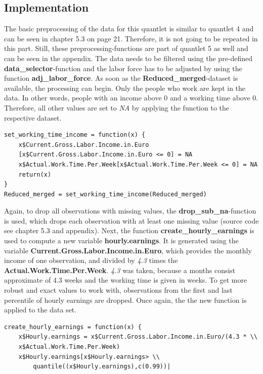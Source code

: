 \documentclass[a4paper]{article}
\begin{document}
{\subsection{Implementation}
The basic preprocessing of the data for this quantlet is similar to quantlet 4 and can be seen in chapter 5.3 on page 21. Therefore, it is not going to be repeated in this part. Still, these preprocessing-functions are part of quantlet 5 as well and can be seen in the appendix. \linebreak\linebreak
The data needs to be filtered using the pre-defined \textbf{data\_selector}-function and the labor force has to be adjusted by using the function \textbf{adj\_labor\_force}.
%
As soon as the \textbf{Reduced\_merged}-dataset is available, the processing can begin. Only the people who work are kept in the data. In other words, people with an income above 0 and a working time above 0. Therefore, all other values are set to \textit{NA} by applying the function to the respective dataset.
\begin{lstlisting}
set_working_time_income = function(x) {
	x$Current.Gross.Labor.Income.in.Euro
	[x$Current.Gross.Labor.Income.in.Euro <= 0] = NA
    x$Actual.Work.Time.Per.Week[x$Actual.Work.Time.Per.Week <= 0] = NA
    return(x)
}
Reduced_merged = set_working_time_income(Reduced_merged)
\end{lstlisting}
Again, to drop all observations with missing values, the \textbf{drop\_sub\_na}-function is used, which drops each observation with at least one missing value (source code see chapter 5.3 and appendix). 
%
Next, the function \textbf{create\_hourly\_earnings} is used to compute a new variable \textbf{hourly.earnings}. It is generated using the variable \textbf{Current.Gross.Labor.Income.in.Euro}, which provides the monthly income of one observation, and divided by \textit{4.3} times the \textbf{Actual.Work.Time.Per.Week}. \textit{4.3} was taken, because a months consist approximate of 4.3 weeks and the working time is given in weeks. 
To get more robust and exact values to work with, observations from the first and last percentile of hourly earnings are dropped. Once again, the the new function is applied to the data set. 
\begin{lstlisting}
create_hourly_earnings = function(x) {
	x$Hourly.earnings = x$Current.Gross.Labor.Income.in.Euro/(4.3 * \\
	x$Actual.Work.Time.Per.Week)
	x$Hourly.earnings[x$Hourly.earnings> \\
    	quantile((x$Hourly.earnings),c(0.99))|

\end{lstlisting}}
\end{document}

